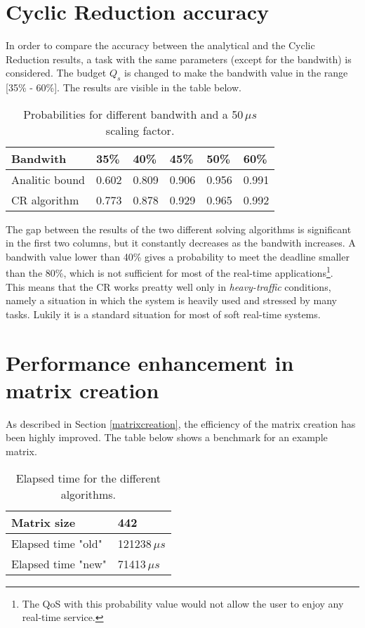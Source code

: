 \section{Cyclic Reduction accuracy} \label{craccuracy}
In order to compare the accuracy between the analytical and the Cyclic Reduction results, a task with the same parameters (except for the bandwith) is considered. The budget \( Q_{s} \) is changed to make the bandwith value in the range [35\% - 60\%]. The results are visible in the table below.
\begin{table}[H]
\label{comparison}
\begin{center}
\begin{tabular}{| l | l | l | l | l | l |}
  \hline
  Bandwith & 35\% & 40\% & 45\% & 50\% & 60\% \\ \hline
  Analitic bound & 0.602 & 0.809 & 0.906 & 0.956 & 0.991 \\
  CR algorithm & 0.773 & 0.878 & 0.929 & 0.965 & 0.992 \\ \hline
\end{tabular}
\caption[]{Probabilities for different bandwith and a 50\,\( \mu{s} \) scaling factor\footnotemark[3].}
\end{center} 
\end{table}

The gap between the results of the two different solving algorithms is significant in the first two columns, but it constantly decreases as the bandwith increases. A bandwith value lower than 40\% gives a probability to meet the deadline smaller than the 80\%, which is not sufficient for most of the real-time applications\footnote{The QoS with this probability value would not allow the user to enjoy any real-time service.}.\\
This means that the CR works preatty well only in \emph{heavy-traffic} conditions, namely a situation in which the system is heavily used and stressed by many tasks. Lukily it is a standard situation for most of soft real-time systems.  

\section{Performance enhancement in matrix creation} \label{matrixperformance}
As described in Section \ref{matrixcreation}, the efficiency of the matrix creation has been highly improved. The table below shows a benchmark for an example matrix.
\begin{table}[H]
\label{benchmark}
\begin{center}
\begin{tabular}{| l | l |}
  \hline
  Matrix size & 442 \\ \hline
  Elapsed time "old" & 121238\( \,\mu{s} \) \\ \hline
  Elapsed time "new" & 71413\( \,\mu{s} \) \\ \hline
\end{tabular}
\caption[]{Elapsed time for the different algorithms\footnotemark.}
\end{center}
\end{table}

